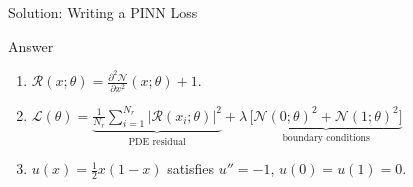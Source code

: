 \documentclass[aspectratio=169,11pt]{beamer}
\begin{document}
\begin{frame}{Solution: Writing a PINN Loss}
\begin{block}{Answer}
\begin{enumerate}
    \item $\mathcal{R}(x; \theta) = \frac{\partial^2 \mathcal{N}}{\partial x^2}(x; \theta) + 1$.
    \item $\mathcal{L}(\theta) = \underbrace{\frac{1}{N_r}\sum_{i=1}^{N_r} \bigl|\mathcal{R}(x_i; \theta)\bigr|^2}_{\text{PDE residual}} + \lambda\,\underbrace{\bigl[\mathcal{N}(0;\theta)^2 + \mathcal{N}(1;\theta)^2\bigr]}_{\text{boundary conditions}}$
    \item $u(x) = \tfrac{1}{2}x(1-x)$ satisfies $u''=-1$, $u(0)=u(1)=0$. \checkmark
\end{enumerate}
\end{block}
\end{frame}
\end{document}

